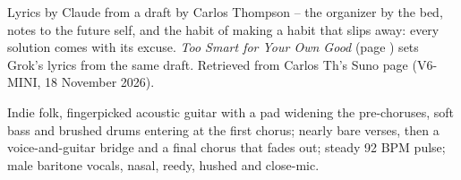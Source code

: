 
\label{sec:too-smart-for-your-own-good}
\begin{notes}
Lyrics by Claude from a draft by Carlos Thompson -- the organizer by the bed, notes to the future self, and the habit of making a habit that slips away: every solution comes with its excuse. \emph{Too Smart for Your Own Good} (page \pageref{sec:too-smart-for-your-own-good-dubstep}) sets Grok's lyrics from the same draft. Retrieved from Carlos Th's Suno page (V6-MINI, 18 November 2026).
\end{notes}
\begin{style}
Indie folk, fingerpicked acoustic guitar with a pad widening the pre-choruses, soft bass and brushed drums entering at the first chorus; nearly bare verses, then a voice-and-guitar bridge and a final chorus that fades out; steady 92 BPM pulse; male baritone vocals, nasal, reedy, hushed and close-mic.
\end{style}
